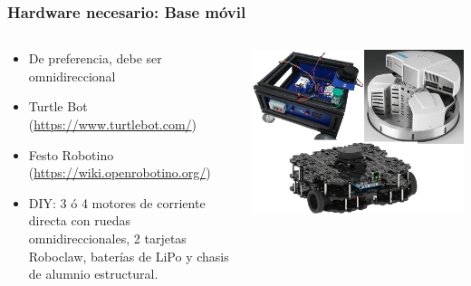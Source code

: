 \begin{frame}\frametitle{Hardware necesario: Base móvil}
  \begin{columns}
    \begin{column}{0.5\textwidth}
      \begin{itemize}
      \item De preferencia, debe ser omnidireccional
      \item Turtle Bot (\url{https://www.turtlebot.com/})
      \item Festo Robotino (\url{https://wiki.openrobotino.org/})
      \item DIY: 3 ó 4 motores de corriente directa con ruedas omnidireccionales, 2 tarjetas Roboclaw, baterías de LiPo y chasis de alumnio estructural.
      \end{itemize}
    \end{column}
    \begin{column}{0.5\textwidth}
      \includegraphics[width=\textwidth]{Figures/Bases.png}
    \end{column}
  \end{columns}
\end{frame}


